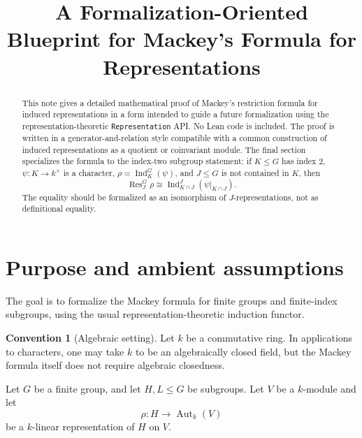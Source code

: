 \documentclass[11pt]{article}
\title{A Formalization-Oriented Blueprint for Mackey's Formula for Representations}
\author{}
\date{}
\theoremstyle{definition}
\newtheorem{convention}[theorem]{Convention}
\newcommand{\Ind}{\operatorname{Ind}}
\newcommand{\Res}{\operatorname{Res}}
\newcommand{\Aut}{\operatorname{Aut}}
\begin{document}
\maketitle

\begin{abstract}
This note gives a detailed mathematical proof of Mackey's restriction formula for induced representations in a form intended to guide a future formalization using the representation-theoretic \texttt{Representation} API. No Lean code is included. The proof is written in a generator-and-relation style compatible with a common construction of induced representations as a quotient or coinvariant module. The final section specializes the formula to the index-two subgroup statement: if $K \leq G$ has index $2$, $\psi : K \to k^\times$ is a character, $\rho = \Ind_K^G(\psi)$, and $J \leq G$ is not contained in $K$, then
\[
  \Res^G_J \rho \cong \Ind_{K \cap J}^{J}(\psi|_{K\cap J}).
\]
The equality should be formalized as an isomorphism of $J$-representations, not as definitional equality.
\end{abstract}

\tableofcontents

\section{Purpose and ambient assumptions}

The goal is to formalize the Mackey formula for finite groups and finite-index subgroups, using the usual representation-theoretic induction functor.

\begin{convention}[Algebraic setting]
Let $k$ be a commutative ring. In applications to characters, one may take $k$ to be an algebraically closed field, but the Mackey formula itself does not require algebraic closedness.

Let $G$ be a finite group, and let $H,L \leq G$ be subgroups. Let $V$ be a $k$-module and let
\[
  \rho : H \to \Aut_k(V)
\]
be a $k$-linear representation of $H$ on $V$.
\end{convention}
\end{document}
